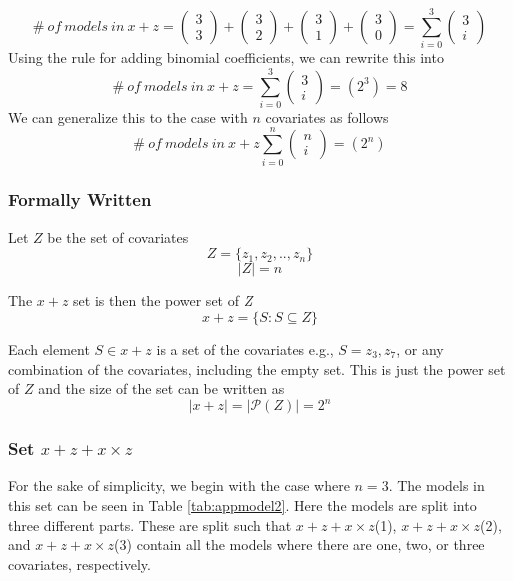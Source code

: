 \[\#\ of\ models\ in\ x + z = \left( \begin{array}{c}
3 \\ 
3 \end{array}
\right)+\left( \begin{array}{c}
3 \\ 
2 \end{array}
\right)+\left( \begin{array}{c}
3 \\ 
1 \end{array}
\right)+\left( \begin{array}{c}
3 \\ 
0 \end{array}
\right)=\sum^3_{i=0}{\left( \begin{array}{c}
3 \\ 
i \end{array}
\right)}\] 
Using the rule for adding binomial coefficients, we can rewrite this into
\[\#\ of\ models\ in\ x + z = \sum^3_{i=0}{\left( \begin{array}{c}
3 \\ 
i \end{array}
\right)}=\left(2^3\right)=8\] 
We can generalize this to the case with $n$ covariates  as follows 
\[\#\ of\ models\ in\ x + z\sum^n_{i=0}{\left( \begin{array}{c}
n \\ 
i \end{array}
\right)}=\left(2^n\right)\] 

\subsubsection{Formally Written} Let $Z$ be the set of covariates 
\[Z=\{\left.z_1,z_2,..,z_n\right.\}\] 
\[\left|Z\right|=n\] 


\noindent The $x + z$ set is then the power set of \emph{Z} 
\[x + z = \{\left.S:S\subseteq Z\right.\}\] 

Each element $S\in x + z$ is a set of the covariates e.g., $S=\left.z_3,z_7\right.$, or any combination of the covariates, including the empty set. This is just the power set of $Z$ and the size of the set can be written as
\[\left|x + z\right|=|\mathcal{P}\left(Z\right)|=2^n\] 
\subsubsection{Set $x + z + x \times z$}
For the sake of simplicity, we begin with the case where $n=3$. The models in this set can be seen in Table \ref{tab:appmodel2}. Here the models are split into three different parts. These are split such that $x + z + x \times z$(1), $x + z + x \times z$(2), and $x + z + x \times z$(3) contain all the models where there are one, two, or three covariates, respectively.\\

